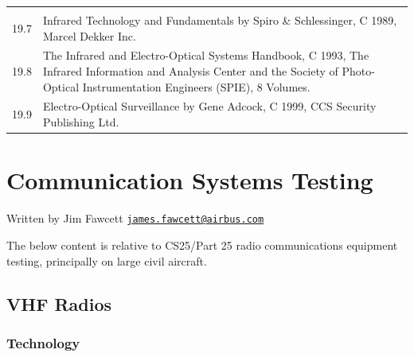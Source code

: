 \documentclass[
]{book}
\begin{document}
\begin{longtable}[]{@{}ll@{}}
\begin{minipage}[t]{0.88\columnwidth}
\end{minipage}\tabularnewline
\begin{minipage}[t]{0.06\columnwidth}\raggedright
19.7\strut
\end{minipage} & \begin{minipage}[t]{0.88\columnwidth}\raggedright
Infrared Technology and Fundamentals by Spiro \& Schlessinger, C 1989, Marcel Dekker Inc.\strut
\end{minipage}\tabularnewline
\begin{minipage}[t]{0.06\columnwidth}\raggedright
19.8\strut
\end{minipage} & \begin{minipage}[t]{0.88\columnwidth}\raggedright
The Infrared and Electro-Optical Systems Handbook, C 1993, The Infrared Information and Analysis Center and the Society of Photo-Optical Instrumentation Engineers (SPIE), 8 Volumes.\strut
\end{minipage}\tabularnewline
\begin{minipage}[t]{0.06\columnwidth}\raggedright
19.9\strut
\end{minipage} & \begin{minipage}[t]{0.88\columnwidth}\raggedright
Electro-Optical Surveillance by Gene Adcock, C 1999, CCS Security Publishing Ltd.\strut
\end{minipage}\tabularnewline
\bottomrule
\end{longtable}

\hypertarget{communication-systems-testing}{%
\chapter{Communication Systems Testing}\label{communication-systems-testing}}

Written by Jim Fawcett \href{mailto:james.fawcett@airbus.com}{\nolinkurl{james.fawcett@airbus.com}}

The below content is relative to CS25/Part 25 radio communications equipment
testing, principally on large civil aircraft.

\hypertarget{vhf-radios}{%
\section{VHF Radios}\label{vhf-radios}}

\hypertarget{technology}{%
\subsection{Technology}\label{technology}}
\end{document}
